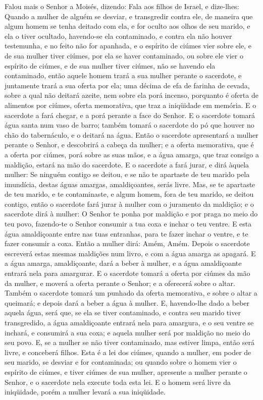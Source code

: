 Falou mais o Senhor a Moisés, dizendo: Fala aos filhos de
Israel, e dize-lhes: Quando a mulher de alguém se desviar, e
transgredir contra ele, de maneira que algum homem se tenha
deitado com ela, e for oculto aos olhos de seu marido, e ela o tiver
ocultado, havendo-se ela contaminado, e contra ela não houver
testemunha, e no feito não for apanhada, e o espírito de
ciúmes vier sobre ele, e de sua mulher tiver ciúmes, por ela se
haver contaminado, ou sobre ele vier o espírito de ciúmes, e de sua
mulher tiver ciúmes, não se havendo ela contaminado, então
aquele homem trará a sua mulher perante o sacerdote, e juntamente
trará a sua oferta por ela; uma décima de efa de farinha de cevada,
sobre a qual não deitará azeite, nem sobre ela porá incenso,
porquanto é oferta de alimentos por ciúmes, oferta memorativa, que
traz a iniqüidade em memória. E o sacerdote a fará chegar, e
a porá perante a face do Senhor. E o sacerdote tomará água
santa num vaso de barro; também tomará o sacerdote do pó que houver
no chão do tabernáculo, e o deitará na água. Então o
sacerdote apresentará a mulher perante o Senhor, e descobrirá a
cabeça da mulher; e a oferta memorativa, que é a oferta por ciúmes,
porá sobre as suas mãos, e a água amarga, que traz consigo a
maldição, estará na mão do sacerdote. E o sacerdote a fará
jurar, e dirá àquela mulher: Se ninguém contigo se deitou, e se não
te apartaste de teu marido pela imundícia, destas águas amargas,
amaldiçoantes, serás livre. Mas, se te apartaste de teu
marido, e te contaminaste, e algum homem, fora de teu marido, se
deitou contigo, então o sacerdote fará jurar à mulher com o
juramento da maldição; e o sacerdote dirá à mulher: O Senhor te
ponha por maldição e por praga no meio do teu povo, fazendo-te o
Senhor consumir a tua coxa e inchar o teu ventre. E esta água
amaldiçoante entre nas tuas entranhas, para te fazer inchar o
ventre, e te fazer consumir a coxa. Então a mulher dirá: Amém, Amém.
Depois o sacerdote escreverá estas mesmas maldições num
livro, e com a água amarga as apagará. E a água amarga,
amaldiçoante, dará a beber à mulher, e a água amaldiçoante entrará
nela para amargurar. E o sacerdote tomará a oferta por ciúmes
da mão da mulher, e moverá a oferta perante o Senhor; e a oferecerá
sobre o altar. Também o sacerdote tomará um punhado da oferta
memorativa, e sobre o altar a queimará; e depois dará a beber a água
à mulher. E, havendo-lhe dado a beber aquela água, será que,
se ela se tiver contaminado, e contra seu marido tiver transgredido,
a água amaldiçoante entrará nela para amargura, e o seu ventre se
inchará, e consumirá a sua coxa; e aquela mulher será por maldição
no meio do seu povo. E, se a mulher se não tiver contaminado,
mas estiver limpa, então será livre, e conceberá filhos. Esta
é a lei dos ciúmes, quando a mulher, em poder de seu marido, se
desviar e for contaminada; ou quando sobre o homem vier o
espírito de ciúmes, e tiver ciúmes de sua mulher, apresente a mulher
perante o Senhor, e o sacerdote nela execute toda esta lei. E
o homem será livre da iniqüidade, porém a mulher levará a sua
iniqüidade.

